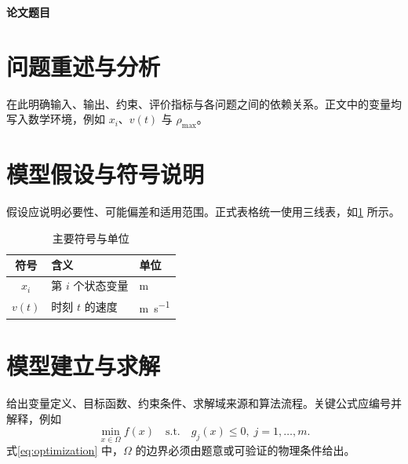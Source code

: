 \documentclass[UTF8,zihao=-4,a4paper]{ctexart}
\newcommand{\MiraTitle}[1]{%
  \begin{center}
    {\color{black}\heiti\zihao{2}\bfseries #1\par}
  \end{center}
}
\newcommand{\keywords}[1]{\par\noindent\textbf{关键词：}#1}
\begin{document}
\MiraTitle{论文题目}

\begin{abstract}
\textbf{问题一：}解释任务的数学实质，说明方法、关键结果及直接验证证据。

\textbf{问题二：}说明共享数学核心与本问新增约束，报告关键数值、误差和稳健性证据。

\textbf{问题三：}概括算法链和主要结论，并说明适用边界、局限或可迁移条件。

\textbf{问题四：}给出范围认证、最优性证据与最终结论，避免仅凭粗网格宣称全局最优。

\keywords{数学建模；关键词二；关键词三；稳健性分析}
\end{abstract}
\clearpage

\tableofcontents
\clearpage
{}
\label{mira-body-start}

\section{问题重述与分析}
在此明确输入、输出、约束、评价指标与各问题之间的依赖关系。正文中的变量均写入数学环境，例如 $x_i$、$v(t)$ 与 $\rho_{\max}$。

\section{模型假设与符号说明}
假设应说明必要性、可能偏差和适用范围。正式表格统一使用三线表，如\cref{tab:symbols} 所示。

\begin{table}[H]
  \centering
  \caption{主要符号与单位}
  \label{tab:symbols}
  \begin{tabular}{cll}
    \toprule
    符号 & 含义 & 单位 \\
    \midrule
    $x_i$ & 第 $i$ 个状态变量 & \si{m} \\
    $v(t)$ & 时刻 $t$ 的速度 & \si{m.s^{-1}} \\
    \bottomrule
  \end{tabular}
\end{table}

\section{模型建立与求解}
给出变量定义、目标函数、约束条件、求解域来源和算法流程。关键公式应编号并解释，例如
\begin{equation}
  \min_{x\in\Omega} f(x) \quad \text{s.t.}\quad g_j(x)\leq 0,\;j=1,\ldots,m.
  \label{eq:optimization}
\end{equation}
式\eqref{eq:optimization} 中，$\Omega$ 的边界必须由题意或可验证的物理条件给出。
\end{document}
